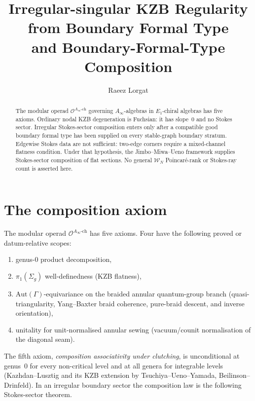 \documentclass[11pt]{amsart}
\title{Irregular-singular KZB Regularity from Boundary Formal Type\\
and Boundary-Formal-Type Composition}
\author{Raeez Lorgat}
\theoremstyle{definition}
\theoremstyle{remark}
\providecommand{\Ainf}{A_\infty}
\begin{document}
\maketitle

\begin{abstract}
The modular operad $\mathcal{O}^{\Ainf\text{-ch}}$ governing
$\Ainf$-algebras in $E_1$-chiral algebras has five axioms. Ordinary
nodal KZB degeneration is Fuchsian: it has slope~$0$ and no Stokes
sector.  Irregular Stokes-sector composition enters only after a
compatible good boundary formal type has been supplied on every
stable-graph boundary stratum.  Edgewise Stokes data are not
sufficient: two-edge corners require a mixed-channel flatness
condition.  Under that hypothesis, the Jimbo--Miwa--Ueno framework
supplies Stokes-sector composition of flat sections.  No general
$\mathcal{W}_N$ Poincar\'e-rank or Stokes-ray count is asserted here.
\end{abstract}

\section{The composition axiom}

The modular operad $\mathcal{O}^{\Ainf\text{-ch}}$ has five axioms.
Four have the following proved or datum-relative scopes:
\begin{enumerate}[label=(\roman*)]
\item genus-$0$ product decomposition,
\item $\pi_1(\Sigma_g)$ well-definedness (KZB flatness),
\item $\mathrm{Aut}(\Gamma)$-equivariance on the braided annular
quantum-group branch (quasi-triangularity, Yang--Baxter braid
coherence, pure-braid descent, and inverse orientation),
\item unitality for unit-normalised annular sewing (vacuum/counit
normalisation of the diagonal seam).
\end{enumerate}
The fifth axiom, \emph{composition associativity under clutching}, is
unconditional at genus~$0$ for every non-critical level and at all
genera for integrable levels (Kazhdan--Lusztig and its KZB extension
by Tsuchiya--Ueno--Yamada, Beilinson--Drinfeld). In an irregular
boundary sector the composition law is the following Stokes-sector
theorem.
\end{document}
